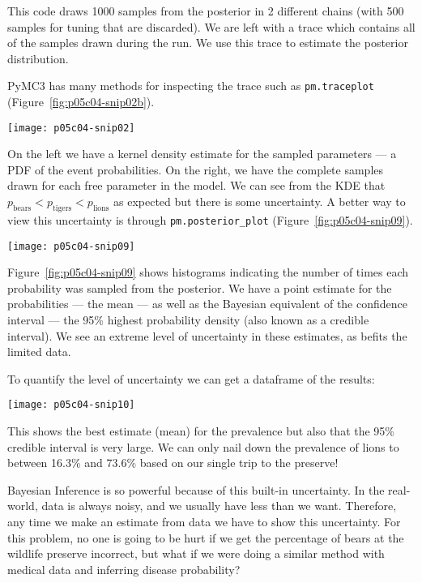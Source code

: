 This code draws 1000 samples from the posterior in 2 different chains (with 500 samples for tuning that are discarded). We are left with a trace which contains all of the samples drawn during the run. We use this trace to estimate the posterior distribution.

PyMC3 has many methods for inspecting the trace such as \lstinline{pm.traceplot} (Figure~\ref{fig:p05c04-snip02b}).

\begin{figure*}[h]
    \texttt{[image: p05c04-snip02]}
    \caption{PDF and trace of samples}
    \label{fig:p05c04-snip02b}
\end{figure*}

On the left we have a kernel density estimate for the sampled parameters --- a PDF of the event probabilities. On the right, we have the complete samples drawn for each free parameter in the model. We can see from the KDE that $p_\textrm{bears}<p_\textrm{tigers}<p_\textrm{lions}$ as expected but there is some uncertainty. A better way to view this uncertainty is through \lstinline{pm.posterior_plot} (Figure~\ref{fig:p05c04-snip09}).

\begin{figure*}[h]
    \texttt{[image: p05c04-snip09]}
    \caption{Posterior plots from PyMC3}
    \label{fig:p05c04-snip09}
\end{figure*}

Figure~\ref{fig:p05c04-snip09} shows histograms indicating the number of times each probability was sampled from the posterior. We have a point estimate for the probabilities --- the mean --- as well as the Bayesian equivalent of the confidence interval --- the 95\% highest probability density (also known as a credible interval). We see an extreme level of uncertainty in these estimates, as befits the limited data.

To quantify the level of uncertainty we can get a dataframe of the results:

\begin{figure*}[h]
    \texttt{[image: p05c04-snip10]}
    \caption{Posterior plots from PyMC3}
\end{figure*}

This shows the best estimate (mean) for the prevalence but also that the 95\% credible interval is very large. We can only nail down the prevalence of lions to between 16.3\% and 73.6\% based on our single trip to the preserve!

Bayesian Inference is so powerful because of this built-in uncertainty. In the real-world, data is always noisy, and we usually have less than we want. Therefore, any time we make an estimate from data we have to show this uncertainty. For this problem, no one is going to be hurt if we get the percentage of bears at the wildlife preserve incorrect, but what if we were doing a similar method with medical data and inferring disease probability?

